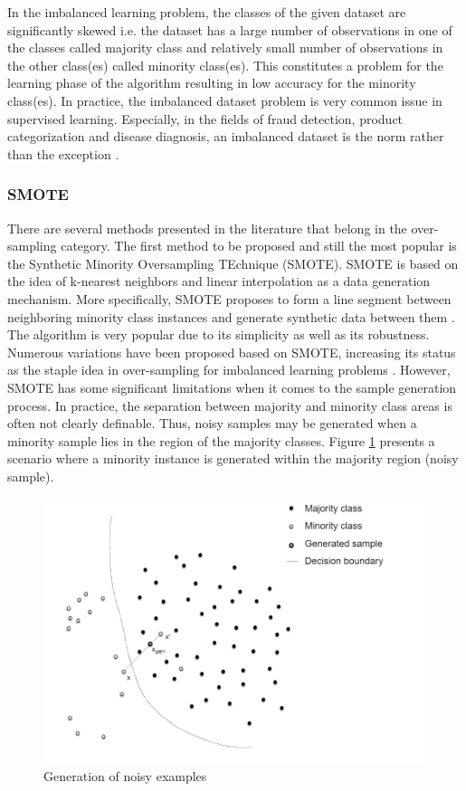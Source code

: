 \documentclass[parskip=full]{scrartcl}
\begin{document}
In the imbalanced learning problem, the classes of the given dataset are
significantly skewed i.e. the dataset has a large number of observations in one
of the classes called majority class and relatively small number of observations
in the other class(es) called minority class(es). This constitutes a problem for
the learning phase of the algorithm resulting in low accuracy for the minority
class(es). In practice, the imbalanced dataset problem is very common issue in
supervised learning. Especially, in the fields of fraud detection, product
categorization and disease diagnosis, an imbalanced dataset is the norm rather
than the exception \cite{He.2013}. 

\subsubsection{SMOTE}

There are several methods presented in the literature that belong in the
over-sampling category. The first method to be  proposed and still the most
popular is the Synthetic Minority Oversampling TEchnique (SMOTE). SMOTE is based
on the idea of k-nearest neighbors and linear interpolation as a data generation
mechanism. More specifically, SMOTE proposes to form a line segment between
neighboring minority class instances and generate synthetic data between them
\cite{Chawla.2002}. The algorithm is very popular due to its simplicity as well
as its robustness. Numerous variations have been proposed based on SMOTE,
increasing its status as the staple idea in over-sampling for imbalanced
learning problems \cite{Fernandez.2018}. However, SMOTE has some significant
limitations when it comes to the sample generation process. In practice, the
separation between majority and minority class areas is often not clearly
definable. Thus, noisy samples may be generated when a minority sample lies in
the region of the majority classes. Figure \ref{fig:noisy-examples} presents a
scenario where a minority instance is generated within the majority region
(noisy sample).

\begin{figure}[H]
	\centering
	\includegraphics[width=0.6\linewidth]{../analysis/noisy_examples.png}
	\caption{Generation of noisy examples \cite{Douzas.2019}}
	\label{fig:noisy-examples}
\end{figure}
\end{document}
